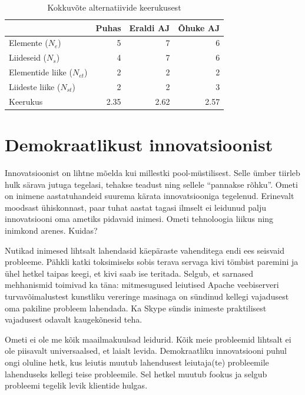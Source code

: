 \documentclass{tufte-book}
\begin{document}
\begin{table}
	\begin{center}
		\begin{tabular}{p{3.6 cm}rrr}
		\toprule
& Puhas & Eraldi AJ & Õhuke AJ \\
		\midrule
Elemente ($N_e$) &	5 &	7 &	6\\
Liideseid  ($N_s$)	& 4 &	7 &	6\\
Elementide liike  ($N_{et}$)&	2	&2	&2\\
Liideste liike  ($N_{st}$)&	2 &	2 &	3\\
		\midrule
Keerukus &	2.35 &	2.62	 &2.57\\
		\bottomrule
		\end{tabular}
		\caption{Kokkuvõte alternatiivide keerukusest}
		\label{tab:complexity}

	\end{center}
\end{table}

\section{Demokraatlikust innovatsioonist}
Innovatsioonist on lihtne mõelda kui millestki pool-müstilisest. Selle ümber tiirleb hulk särava jutuga tegelasi, tehakse teadust ning sellele \enquote{pannakse rõhku}. Ometi on inimene aastatuhandeid suurema kärata innovatsiooniga tegelenud. Erinevalt moodsast ühiskonnast, paar tuhat aastat tagasi ilmselt ei leidunud palju innovatsiooni oma ametiks pidavaid inimesi. Ometi tehnoloogia liikus ning inimkond arenes. Kuidas?

Nutikad inimesed lihtsalt lahendasid käepäraste vahenditega endi ees seisvaid probleeme. Pähkli katki toksimiseks sobis terava servaga kivi tömbist paremini ja ühel hetkel taipas keegi, et kivi saab ise teritada. Selgub\cite{hippel}, et sarnased mehhanismid toimivad ka täna: mitmesugused leiutised Apache veebiserveri turvavõimalustest kunstliku vereringe masinaga on sündinud kellegi vajadusest oma pakiline probleem lahendada. Ka Skype sündis inimeste praktilisest vajadusest odavalt kaugekõnesid teha. 

Ometi ei ole me kõik maailmakuulsad leidurid. Kõik meie probleemid lihtsalt ei ole piisavalt universaalsed, et laialt levida. Demokraatliku innovatsiooni puhul ongi oluline hetk, kus leiutis muutub lahendusest leiutaja(te) probleemile lahenduseks kellegi teise probleemile. Sel hetkel muutub fookus ja selgub probleemi tegelik levik klientide hulgas. 
\end{document}
